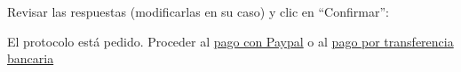\documentclass[12pt, spanish]{article}
\begin{document}
\begin{steps}
            \medskip
            \begin{minipage}[t]{\linewidth}
            \raggedright
        \end{minipage}

        \item Revisar las respuestas (modificarlas en su caso) y clic en ``Confirmar'':

            \medskip
            \begin{minipage}[t]{\linewidth}
            \raggedright
        \end{minipage}

        \item El protocolo está pedido. Proceder al \hyperref[sec:paypal]{pago con Paypal}
            o al \hyperref[sec:transfer]{pago por transferencia bancaria}


\end{steps}
\end{document}
